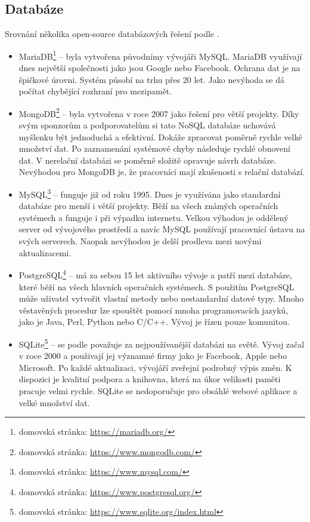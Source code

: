         \subsection{Databáze}
            Srovnání několika open-source databázových řešení podle \cite{database}.
            \begin{itemize}
                
                \item MariaDB\footnote{domovská stránka: \url{https://mariadb.org/}} – byla vytvořena původnímy vývojáři MySQL. MariaDB využívají dnes největší společnosti jako jsou Google nebo Facebook. Ochrana dat je na špičkové úrovni. Systém působí na trhu přes 20 let. Jako nevýhoda se dá počítat chybějící rozhraní pro mezipamět.
                
                \item MongoDB\footnote{domovská stránka: \url{https://www.mongodb.com/}} – byla vytvořena v roce 2007 jako řešení pro větší projekty. Díky svým sponzorům a podporovatelům si tato NoSQL databáze uchovává myšlenku být jednoduchá a efektivní. Dokáže zpracovat poměrně rychle velké množství dat. Po zaznamenání systémové chyby následuje rychlé obnovení dat. V nerelační databázi se poměrně složitě opravuje návrh databáze. Nevýhodou pro MongoDB je, že pracovnící mají zkušenosti s relační databází.
                
                \item MySQL\footnote{domovská stránka: \url{https://www.mysql.com/}} – funguje již od roku 1995. Dnes je využívána jako standardní databáze pro menší i větší projekty. Běží na všech známých operačních systémech a funguje i při výpadku internetu. Velkou výhodou je oddělený server od vývojového prostředí a navíc MySQL používají pracovnící ústavu na svých serverech. Naopak nevýhodou je delší prodleva mezi novými aktualizacemi.
                
                \item PostgreSQL\footnote{domovská stránka: \url{https://www.postgresql.org/}} – má za sebou 15 let aktivního vývoje a patří mezi databáze, které běží na všech hlavních operačních systémech. S použitím PostgreSQL může uživatel vytvořit vlastní metody nebo nestandardní datové typy. Mnoho věstavěných procedur lze spouštět pomocí mnoha programovacích jazyků, jako je Java, Perl, Python nebo C/C++. Vývoj je řízen pouze komunitou.
                
                \item SQLite\footnote{domovská stránka: \url{https://www.sqlite.org/index.html}} – se podle \cite{database} považuje za nejpoužívanější databázi na světě. Vývoj začal v roce 2000 a použivají jej významné firmy jako je Facebook, Apple nebo Microsoft. Po každé aktualizaci, vývojáří zveřejní podrobný výpis změn. K dispozici je kvalitní podpora a knihovna, která na úkor velikosti paměti pracuje velmi rychle. SQLite se nedoporučuje pro obsáhlé webové aplikace a velké množství dat. 
                
        \end{itemize}
        
